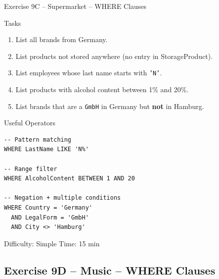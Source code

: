\documentclass[10pt]{beamer}
\begin{document}
\begin{frame}[fragile]{Exercise 9C -- Supermarket -- WHERE Clauses}
  \begin{block}{Tasks}
    \begin{enumerate}
      \item List all brands from Germany.
      \item List products not stored anywhere (no entry in StorageProduct).
      \item List employees whose last name starts with \texttt{'N'}.
      \item List products with alcohol content between 1\% and 20\%.
      \item List brands that are a \texttt{GmbH} in Germany but \textbf{not} in Hamburg.
    \end{enumerate}
  \end{block}

  \begin{block}{Useful Operators}
\begin{lstlisting}[style=sqlstyle]
-- Pattern matching
WHERE LastName LIKE 'N%'

-- Range filter
WHERE AlcoholContent BETWEEN 1 AND 20

-- Negation + multiple conditions
WHERE Country = 'Germany'
  AND LegalForm = 'GmbH'
  AND City <> 'Hamburg'
\end{lstlisting}
  \end{block}

  \begin{alertblock}{Difficulty: Simple \quad Time: 15 min}
  \end{alertblock}
\end{frame}

\subsection{Exercise 9D -- Music -- WHERE Clauses}
\end{document}
